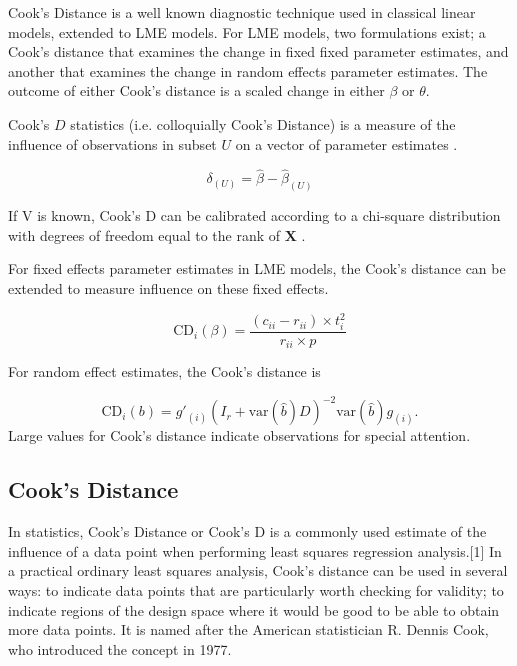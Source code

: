 \documentclass[12pt, a4paper]{article}
\begin{document}
Cook's Distance is a well known diagnostic technique used in classical linear models, extended to LME models.  For LME models, two formulations exist; a Cook's distance that examines the change in fixed fixed parameter estimates, and another that examines the change in random effects parameter estimates. The outcome of either Cook's distance is a scaled change in either $\beta$ or $\theta$.


 Cook's $D$ statistics (i.e. colloquially Cook's Distance) is a measure of the influence of observations in subset $U$ on a vector of parameter estimates \citep{cook77}.


\[ \delta_{(U)} = \hat{\beta} - \hat{\beta}_{(U)}\]


If V is known, Cook's D can be calibrated according to a chi-square distribution with degrees of freedom equal to the rank of $\boldsymbol{X}$ \citep{cpj92}.





For fixed effects parameter estimates in LME models, the  Cook's distance can be extended to measure influence on these fixed effects.


\[
\mbox{CD}_{i}(\beta) = \frac{(c_{ii} - r_{ii}) \times t^2_{i}}{r_{ii} \times p}
\]


For random effect estimates, the  Cook's distance is


\[
\mbox{CD}_{i}(b) = g{\prime}_{(i)} (I_{r} + \mbox{var}(\hat{b})D)^{-2}\mbox{var}(\hat{b})g_{(i)}.
\]
Large values for Cook's distance indicate observations for special attention.




\subsection{Cook's Distance}
In statistics, Cook's Distance or Cook's D is a commonly used estimate of the influence of a data point when performing least squares regression analysis.[1] In a practical ordinary least squares analysis, Cook's distance can be used in several ways: to indicate data points that are particularly worth checking for validity; to indicate regions of the design space where it would be good to be able to obtain more data points. It is named after the American statistician R. Dennis Cook, who introduced the concept in 1977.
\end{document}
